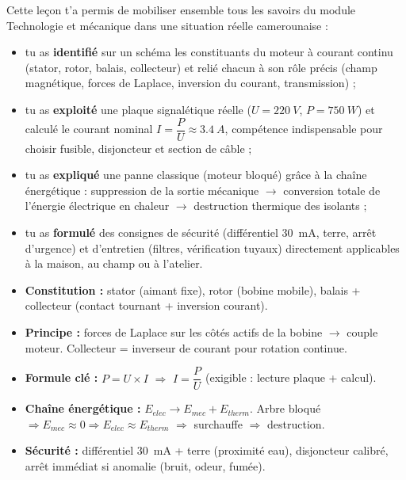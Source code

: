\documentclass[11pt]{article}
\begin{document}
Cette leçon t'a permis de mobiliser ensemble tous les savoirs du module \og Technologie et mécanique \fg{} dans une situation réelle camerounaise :
\begin{itemize}
\item tu as \textbf{identifié} sur un schéma les constituants du moteur à courant continu (stator, rotor, balais, collecteur) et relié chacun à son rôle précis (champ magnétique, forces de Laplace, inversion du courant, transmission) ;
\item tu as \textbf{exploité} une plaque signalétique réelle ($U = \SI{220}{V}$, $P = \SI{750}{W}$) et calculé le courant nominal $I = \dfrac{P}{U} \approx \SI{3,4}{A}$, compétence indispensable pour choisir fusible, disjoncteur et section de câble ;
\item tu as \textbf{expliqué} une panne classique (moteur bloqué) grâce à la chaîne énergétique : suppression de la sortie mécanique $\rightarrow$ conversion totale de l'énergie électrique en chaleur $\rightarrow$ destruction thermique des isolants ;
\item tu as \textbf{formulé} des consignes de sécurité (différentiel $30$~mA, terre, arrêt d'urgence) et d'entretien (filtres, vérification tuyaux) directement applicables à la maison, au champ ou à l'atelier.
\end{itemize}

\begin{attention}
\begin{itemize}
\item \textbf{Constitution :} stator (aimant fixe), rotor (bobine mobile), balais + collecteur (contact tournant + inversion courant).
\item \textbf{Principe :} forces de Laplace sur les côtés actifs de la bobine $\rightarrow$ couple moteur. Collecteur = inverseur de courant pour rotation continue.
\item \textbf{Formule clé :} $P = U \times I$ $\Rightarrow$ $I = \dfrac{P}{U}$ (exigible : lecture plaque + calcul).
\item \textbf{Chaîne énergétique :} $E_{elec} \rightarrow E_{mec} + E_{therm}$. Arbre bloqué $\Rightarrow E_{mec} \approx 0 \Rightarrow E_{elec} \approx E_{therm}$ $\Rightarrow$ surchauffe $\Rightarrow$ destruction.
\item \textbf{Sécurité :} différentiel $30$~mA + terre (proximité eau), disjoncteur calibré, arrêt immédiat si anomalie (bruit, odeur, fumée).
\end{itemize}
\end{attention}
\end{document}
